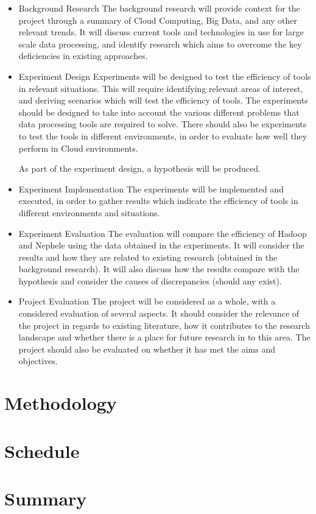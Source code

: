 \begin{itemize}
	\item Background Research
	The background research will provide context for the project through a summary of Cloud Computing, Big Data, and any other relevant trends. It will discuss current tools and technologies in use for large scale data processing, and identify research which aims to overcome the key deficiencies in existing approaches.

	\item Experiment Design
	Experiments will be designed to test the efficiency of tools in relevant situations. This will require identifying relevant areas of interest, and deriving scenarios which will test the efficiency of tools. The experiments should be designed to take into account the various different problems that data processing tools are required to solve. There should also be experiments to test the tools in different environments, in order to evaluate how well they perform in Cloud environments. 

	As part of the experiment design, a hypothesis will be produced.

	\item Experiment Implementation
	The experiments will be implemented and executed, in order to gather results which indicate the efficiency of tools in different environments and situations.

	\item Experiment Evaluation
	The evaluation will compare the efficiency of Hadoop and Nephele using the data obtained in the experiments. It will consider the results and how they are related to existing research (obtained in the background research). It will also discuss how the results compare with the hypothesis and consider the causes of discrepancies (should any exist). 

	\item Project Evaluation
	The project will be considered as a whole, with a considered evaluation of several aspects. It should consider the relevance of the project in regards to existing literature, how it contributes to the research landscape and whether there is a place for future research in to this area. The project should also be evaluated on whether it has met the aims and objectives.
\end{itemize}

\section{Methodology}

\section{Schedule}

\section{Summary}